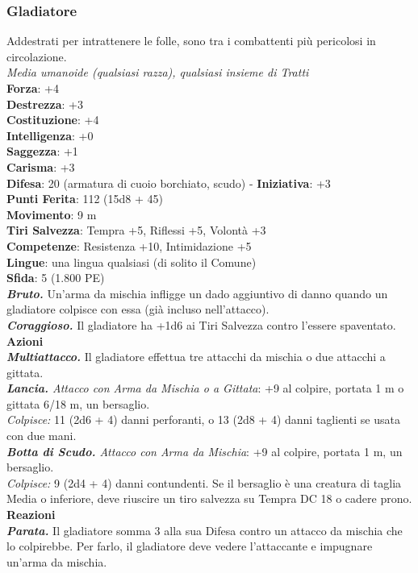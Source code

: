 \begin{multicols}{2}
\subsubsection{Gladiatore}
Addestrati per intrattenere le folle, sono tra i combattenti più pericolosi in circolazione.\\
\emph{Media umanoide (qualsiasi razza), qualsiasi insieme di Tratti}\\
\textbf{Forza}: +4\\
\textbf{Destrezza}: +3\\
\textbf{Costituzione}: +4\\
\textbf{Intelligenza}: +0\\
\textbf{Saggezza}: +1\\
\textbf{Carisma}: +3\\
\textbf{Difesa}: 20 (armatura di cuoio borchiato, scudo) - \textbf{Iniziativa}: +3\\
\textbf{Punti Ferita}: 112 (15d8 + 45)\\
\textbf{Movimento}: 9 m\\
\textbf{Tiri Salvezza}: Tempra +5, Riflessi +5, Volontà +3 \\
\textbf{Competenze}: Resistenza +10, Intimidazione +5\\
\textbf{Lingue}: una lingua qualsiasi (di solito il Comune)\\
\textbf{Sfida}: 5 (1.800 PE)\smallskip\\
\emph{\textbf{Bruto.}} Un'arma da mischia infligge un dado aggiuntivo di danno quando un gladiatore colpisce con essa (già incluso nell'attacco).\\
\emph{\textbf{Coraggioso.}} Il gladiatore ha +1d6 ai Tiri Salvezza contro l'essere spaventato.\\
\smallskip\textbf{Azioni}\\
\emph{\textbf{Multiattacco.}} Il gladiatore effettua tre attacchi da mischia o due attacchi a gittata.\\
\emph{\textbf{Lancia.} Attacco con Arma da Mischia o a Gittata}: +9 al colpire, portata 1 m o gittata 6/18 m, un bersaglio.\\
\emph{Colpisce:} 11 (2d6 + 4) danni perforanti, o 13 (2d8 + 4) danni taglienti se usata con due mani.\\
\emph{\textbf{Botta di Scudo.} Attacco con Arma da Mischia}: +9 al colpire, portata 1 m, un bersaglio.\\
\emph{Colpisce:} 9 (2d4 + 4) danni contundenti. Se il bersaglio è una creatura di taglia Media o inferiore, deve riuscire un tiro salvezza su Tempra DC  18 o cadere prono.\\
\textbf{Reazioni}\\
\emph{\textbf{Parata.}} Il gladiatore somma 3 alla sua Difesa contro un attacco da mischia che lo colpirebbe. Per farlo, il gladiatore deve vedere l'attaccante e impugnare un'arma da mischia.\\


\end{multicols}
